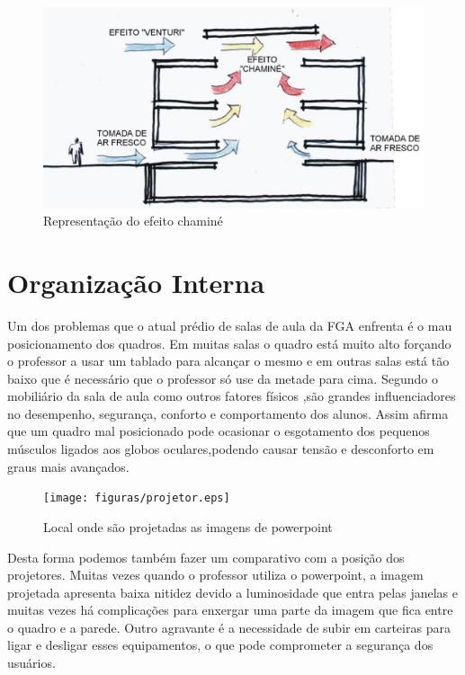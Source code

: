  \begin{figure}[!h]
 	\centering
\includegraphics[keepaspectratio=true,scale=0.45]{figuras/chamine.eps}
 	\caption{Representação do efeito chaminé}
 	\label{fig02242}
\end{figure}

\section{Organização Interna}

Um dos problemas que o atual prédio de salas de aula da FGA enfrenta é o mau posicionamento dos quadros. Em muitas salas o quadro está muito alto forçando o professor a usar um tablado para alcançar o mesmo e em outras salas está tão baixo que é necessário que o professor só use da metade para cima. Segundo \cite{moro2005} o mobiliário da sala de aula como outros fatores físicos ,são grandes influenciadores no desempenho, segurança, conforto e comportamento dos alunos. Assim \cite{luz2005} afirma que um quadro mal posicionado pode ocasionar o esgotamento dos pequenos músculos ligados aos globos oculares,podendo causar tensão e desconforto em graus mais avançados.

 \begin{figure}[!h]
 	\centering
\texttt{[image: figuras/projetor.eps]}
 	\caption{Local onde são projetadas as imagens de powerpoint}
 	\label{fig02242}
\end{figure}

Desta forma podemos também fazer um comparativo com a posição dos projetores. Muitas vezes quando o professor utiliza o powerpoint, a imagem projetada apresenta baixa nitidez devido a luminosidade que entra pelas janelas e muitas vezes há complicações para enxergar uma parte da imagem que fica entre o quadro e a parede. Outro agravante é a necessidade de subir em carteiras para ligar e desligar esses equipamentos, o que pode comprometer a segurança dos usuários.

